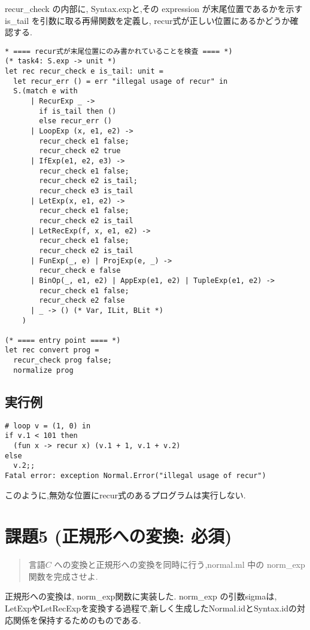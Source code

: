 recur\_check の内部に, Syntax.expと,その expression が末尾位置であるかを示すis\_tail を引数に取る再帰関数を定義し, recur式が正しい位置にあるかどうか確認する.

\begin{lstlisting}[caption=normal.ml]
* ==== recur式が末尾位置にのみ書かれていることを検査 ==== *)
(* task4: S.exp -> unit *)
let rec recur_check e is_tail: unit =   
  let recur_err () = err "illegal usage of recur" in
  S.(match e with
      | RecurExp _ -> 
        if is_tail then () 
        else recur_err ()
      | LoopExp (x, e1, e2) -> 
        recur_check e1 false; 
        recur_check e2 true
      | IfExp(e1, e2, e3) -> 
        recur_check e1 false;
        recur_check e2 is_tail;
        recur_check e3 is_tail
      | LetExp(x, e1, e2) -> 
        recur_check e1 false;
        recur_check e2 is_tail
      | LetRecExp(f, x, e1, e2) -> 
        recur_check e1 false;
        recur_check e2 is_tail
      | FunExp(_, e) | ProjExp(e, _) -> 
        recur_check e false
      | BinOp(_, e1, e2) | AppExp(e1, e2) | TupleExp(e1, e2) -> 
        recur_check e1 false;
        recur_check e2 false
      | _ -> () (* Var, ILit, BLit *)
    )

(* ==== entry point ==== *)
let rec convert prog =
  recur_check prog false;
  normalize prog
\end{lstlisting}

\subsection*{実行例}

\begin{lstlisting}[caption=実行例]
# loop v = (1, 0) in
if v.1 < 101 then
  (fun x -> recur x) (v.1 + 1, v.1 + v.2)
else
  v.2;;
Fatal error: exception Normal.Error("illegal usage of recur")
\end{lstlisting}

このように,無効な位置にrecur式のあるプログラムは実行しない.

\section*{課題5 (正規形への変換: 必須)}

\begin{quotation}
言語$C$ への変換と正規形への変換を同時に行う,normal.ml 中の norm\_exp 関数を完成させよ.
\end{quotation}

正規形への変換は, norm\_exp関数に実装した. norm\_exp の引数sigmaは, LetExpやLetRecExpを変換する過程で,新しく生成したNormal.idとSyntax.idの対応関係を保持するためのものである.

